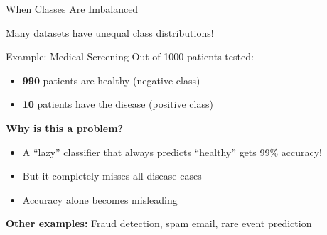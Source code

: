 \documentclass[usenames,dvipsnames]{beamer}
\begin{document}
\begin{frame}{When Classes Are Imbalanced}

Many datasets have unequal class distributions!

\begin{examplebox}{Example: Medical Screening}
Out of 1000 patients tested:
\begin{itemize}
	\item \textbf{990} patients are healthy (negative class)
	\item \textbf{10} patients have the disease (positive class)
\end{itemize}
\end{examplebox}

\pause

\begin{keypointsbox}
\textbf{Why is this a problem?}
\begin{itemize}
	\item A ``lazy'' classifier that always predicts ``healthy'' gets 99\% accuracy!
	\item But it completely misses all disease cases
	\item Accuracy alone becomes misleading
\end{itemize}
\end{keypointsbox}

\pause

\textbf{Other examples:} Fraud detection, spam email, rare event prediction

\end{frame}
\end{document}
